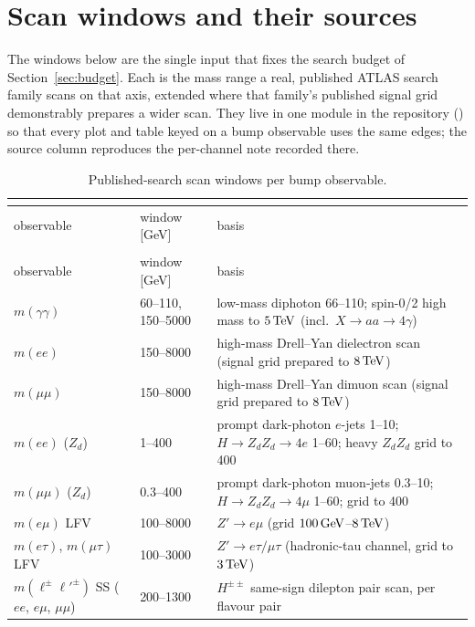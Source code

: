 \section{Scan windows and their sources}
\label{app:windows}

The windows below are the single input that fixes the search budget of Section~\ref{sec:budget}.
Each is the mass range a real, published ATLAS search family scans on that axis, extended where
that family's published signal grid demonstrably prepares a wider scan. They live in one module in
the repository () so that every plot and table keyed on a bump
observable uses the same edges; the source column reproduces the per-channel note recorded there.

\begin{longtable}{@{}>{\raggedright\arraybackslash}p{} l >{\raggedright\arraybackslash}p{}@{}}
\caption{Published-search scan windows per bump observable.}\\[-2mm]
\label{tab:windows}\\
\toprule
observable & window [GeV] & basis \\
\midrule
\endfirsthead
\multicolumn{3}{l}{\small\itshape Table~\ref{tab:windows} continued}\\
\toprule
observable & window [GeV] & basis \\
\midrule
\endhead
\bottomrule
\endfoot
$m(\gamma\gamma)$ & 60--110, 150--5000 & low-mass diphoton 66--110; spin-0/2 high mass to $5\,\mathrm{TeV}$ (incl.\ $X\to aa \to 4\gamma$) \\
$m(ee)$ & 150--8000 & high-mass Drell--Yan dielectron scan (signal grid prepared to $8\,\mathrm{TeV}$) \\
$m(\mu\mu)$ & 150--8000 & high-mass Drell--Yan dimuon scan (signal grid prepared to $8\,\mathrm{TeV}$) \\
$m(ee)$ ($Z_d$) & 1--400 & prompt dark-photon $e$-jets 1--10; $H\to Z_dZ_d \to 4e$ 1--60; heavy $Z_dZ_d$ grid to 400 \\
$m(\mu\mu)$ ($Z_d$) & 0.3--400 & prompt dark-photon muon-jets 0.3--10; $H\to Z_dZ_d \to 4\mu$ 1--60; grid to 400 \\
$m(e\mu)$ LFV & 100--8000 & $Z' \to e\mu$ (grid $100\,\mathrm{GeV}$--$8\,\mathrm{TeV}$) \\
$m(e\tau)$, $m(\mu\tau)$ LFV & 100--3000 & $Z' \to e\tau / \mu\tau$ (hadronic-tau channel, grid to $3\,\mathrm{TeV}$) \\
$m(\ell^\pm\ell'^\pm)$ SS ($ee$, $e\mu$, $\mu\mu$) & 200--1300 & $H^{\pm\pm}$ same-sign dilepton pair scan, per flavour pair \\

\end{longtable}
